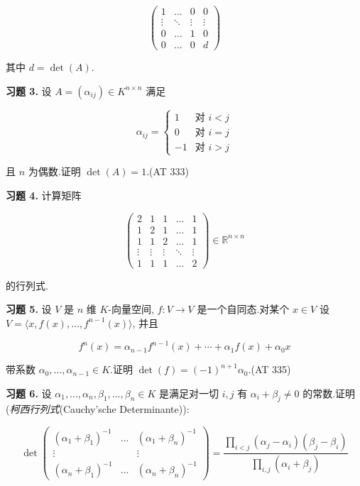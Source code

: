 \[
\begin{pmatrix} 1 & \ldots & 0 & 0 \\ \vdots & \ddots & \vdots & \vdots \\ 0 & \ldots & 1 & 0 \\ 0 & \ldots & 0 & d \end{pmatrix}
\]

其中 $d = \det(A)$.

\medskip
\noindent\textbf{习题 3.} 设 $A = (\alpha_{ij}) \in K^{n \times n}$ 满足

\[
\alpha_{ij} = \begin{cases} 1 & \text{对 } i < j \\ 0 & \text{对 } i = j \\ -1 & \text{对 } i > j \end{cases}
\]

且 $n$ 为偶数.证明 $\det(A) = 1$.(AT 333)

\medskip
\noindent\textbf{习题 4.} 计算矩阵

\[
\begin{pmatrix} 2 & 1 & 1 & \ldots & 1 \\ 1 & 2 & 1 & \ldots & 1 \\ 1 & 1 & 2 & \ldots & 1 \\ \vdots & \vdots & \vdots & \ddots & \vdots \\ 1 & 1 & 1 & \ldots & 2 \end{pmatrix} \in \mathbb{R}^{n \times n}
\]

的行列式.

\medskip
\noindent\textbf{习题 5.} 设 $V$ 是 $n$ 维 $K$-向量空间, $f \colon V \longrightarrow V$ 是一个自同态.对某个 $x \in V$ 设 $V = \langle x, f(x), \ldots, f^{n-1}(x)\rangle$, 并且

\[
f^n(x) = \alpha_{n-1} f^{n-1}(x) + \cdots + \alpha_1 f(x) + \alpha_0 x
\]

带系数 $\alpha_0, \ldots, \alpha_{n-1} \in K$.证明 $\det(f) = (-1)^{n+1} \alpha_0$.(AT 335)

\medskip
\noindent\textbf{习题 6.} 设 $\alpha_1, \ldots, \alpha_n, \beta_1, \ldots, \beta_n \in K$ 是满足对一切 $i, j$ 有 $\alpha_i + \beta_j \neq 0$ 的常数.证明(\emph{柯西行列式}(\textup{Cauchy'sche Determinante})):

\[
\det \begin{pmatrix} (\alpha_1 + \beta_1)^{-1} & \ldots & (\alpha_1 + \beta_n)^{-1} \\ \vdots & & \vdots \\ (\alpha_n + \beta_1)^{-1} & \ldots & (\alpha_n + \beta_n)^{-1} \end{pmatrix} = \frac{\prod_{i < j} (\alpha_j - \alpha_i)(\beta_j - \beta_i)}{\prod_{i, j} (\alpha_i + \beta_j)}
\]

